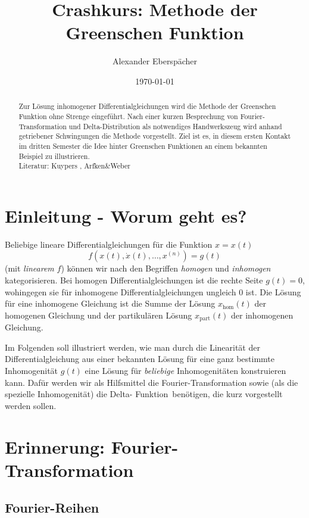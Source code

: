 \documentclass[paper=a4, fontsize=11.0pt, abstractoff, DIV12]{scrartcl}
\title{Crashkurs: Methode der Greenschen Funktion}
\author{Alexander Eberspächer}
\date{\today}
\newcommand{\xhom}{\ensuremath{x_\mathrm{hom}}}
\newcommand{\xinhom}{\ensuremath{x_\mathrm{part}}}
\begin{document}
 \maketitle \begin{abstract} Zur Lösung inhomogener
Differentialgleichungen wird die Methode der Greenschen Funktion ohne
Strenge eingeführt. Nach einer kurzen Besprechung von Fourier-Transformation
und Delta-Distribution als notwendiges Handwerkszeug wird anhand getriebener
Schwingungen die Methode vorgestellt. Ziel ist es, in diesem ersten Kontakt
im dritten Semester die Idee hinter Greenschen Funktionen an einem bekannten
Beispiel zu illustrieren.\\[0.5ex]
Literatur: Kuypers \cite{Kuypers}, Arfken\&Weber \cite{Arfken}
\end{abstract}


\section{Einleitung - Worum geht es?}

Beliebige lineare Differentialgleichungen für die Funktion $x = x(t)$
\begin{equation}
f\left(x(t), \dot{x}(t), \dots, x^{(n)}\right) = g(t)
\end{equation}
(mit \emph{linearem} $f$) können wir nach den Begriffen \emph{homogen} und
\emph{inhomogen} kategorisieren. Bei homogen Differentialgleichungen ist
die rechte Seite $g(t) = 0$, wohingegen sie für inhomogene
Differentialgleichungen ungleich $0$ ist. Die Lösung für eine inhomogene
Gleichung ist die Summe der Lösung $\xhom(t)$ der homogenen Gleichung und
der partikulären Lösung $\xinhom(t)$ der inhomogenen Gleichung.

Im Folgenden soll illustriert werden, wie man durch die Linearität der
Differentialgleichung aus einer bekannten Lösung für eine ganz bestimmte
Inhomogenität $g(t)$ eine Lösung für \emph{beliebige} Inhomogenitäten
konstruieren kann. Dafür werden wir als Hilfsmittel die
Fourier-Transformation sowie (als die spezielle Inhomogenität) die Delta-
\glqq Funktion\grqq~benötigen, die kurz vorgestellt werden sollen.

\section{Erinnerung: Fourier-Transformation}

\subsection{Fourier-Reihen}
\end{document}
